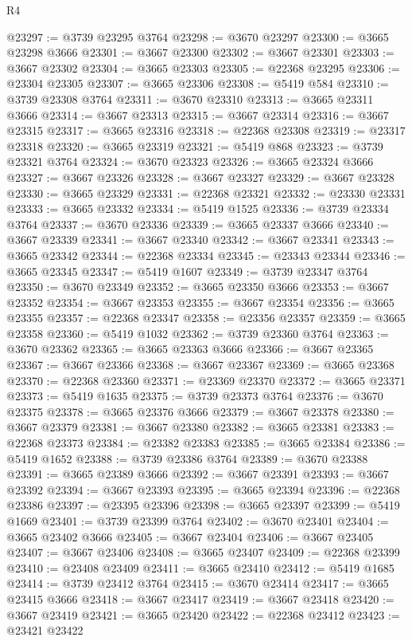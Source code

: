 \begin{lexlean}{R4}
\begin{coremodule}
@23297 := @3739 @23295 @3764
@23298 := @3670 @23297
@23300 := @3665 @23298 @3666
@23301 := @3667 @23300
@23302 := @3667 @23301
@23303 := @3667 @23302
@23304 := @3665 @23303
@23305 := @22368 @23295
@23306 := @23304 @23305
@23307 := @3665 @23306
@23308 := @5419 @584
@23310 := @3739 @23308 @3764
@23311 := @3670 @23310
@23313 := @3665 @23311 @3666
@23314 := @3667 @23313
@23315 := @3667 @23314
@23316 := @3667 @23315
@23317 := @3665 @23316
@23318 := @22368 @23308
@23319 := @23317 @23318
@23320 := @3665 @23319
@23321 := @5419 @868
@23323 := @3739 @23321 @3764
@23324 := @3670 @23323
@23326 := @3665 @23324 @3666
@23327 := @3667 @23326
@23328 := @3667 @23327
@23329 := @3667 @23328
@23330 := @3665 @23329
@23331 := @22368 @23321
@23332 := @23330 @23331
@23333 := @3665 @23332
@23334 := @5419 @1525
@23336 := @3739 @23334 @3764
@23337 := @3670 @23336
@23339 := @3665 @23337 @3666
@23340 := @3667 @23339
@23341 := @3667 @23340
@23342 := @3667 @23341
@23343 := @3665 @23342
@23344 := @22368 @23334
@23345 := @23343 @23344
@23346 := @3665 @23345
@23347 := @5419 @1607
@23349 := @3739 @23347 @3764
@23350 := @3670 @23349
@23352 := @3665 @23350 @3666
@23353 := @3667 @23352
@23354 := @3667 @23353
@23355 := @3667 @23354
@23356 := @3665 @23355
@23357 := @22368 @23347
@23358 := @23356 @23357
@23359 := @3665 @23358
@23360 := @5419 @1032
@23362 := @3739 @23360 @3764
@23363 := @3670 @23362
@23365 := @3665 @23363 @3666
@23366 := @3667 @23365
@23367 := @3667 @23366
@23368 := @3667 @23367
@23369 := @3665 @23368
@23370 := @22368 @23360
@23371 := @23369 @23370
@23372 := @3665 @23371
@23373 := @5419 @1635
@23375 := @3739 @23373 @3764
@23376 := @3670 @23375
@23378 := @3665 @23376 @3666
@23379 := @3667 @23378
@23380 := @3667 @23379
@23381 := @3667 @23380
@23382 := @3665 @23381
@23383 := @22368 @23373
@23384 := @23382 @23383
@23385 := @3665 @23384
@23386 := @5419 @1652
@23388 := @3739 @23386 @3764
@23389 := @3670 @23388
@23391 := @3665 @23389 @3666
@23392 := @3667 @23391
@23393 := @3667 @23392
@23394 := @3667 @23393
@23395 := @3665 @23394
@23396 := @22368 @23386
@23397 := @23395 @23396
@23398 := @3665 @23397
@23399 := @5419 @1669
@23401 := @3739 @23399 @3764
@23402 := @3670 @23401
@23404 := @3665 @23402 @3666
@23405 := @3667 @23404
@23406 := @3667 @23405
@23407 := @3667 @23406
@23408 := @3665 @23407
@23409 := @22368 @23399
@23410 := @23408 @23409
@23411 := @3665 @23410
@23412 := @5419 @1685
@23414 := @3739 @23412 @3764
@23415 := @3670 @23414
@23417 := @3665 @23415 @3666
@23418 := @3667 @23417
@23419 := @3667 @23418
@23420 := @3667 @23419
@23421 := @3665 @23420
@23422 := @22368 @23412
@23423 := @23421 @23422

\end{coremodule}
\end{lexlean}
